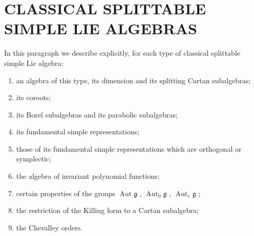 \section{CLASSICAL SPLITTABLE SIMPLE LIE ALGEBRAS}

In this paragraph we describe explicitly, for each type of classical splittable simple Lie algebra:

\begin{enumerate}
\def\labelenumi{(\Roman{enumi})}
\item
  an algebra of this type, its dimension and its splitting Cartan subalgebras;
\item
  its coroots;
\item
  its Borel subalgebras and its parabolic subalgebras;
\item
  its fundamental simple representations;
\item
  those of its fundamental simple representations which are orthogonal or symplectic;
\item
  the algebra of invariant polynomial functions;
\item
  certain properties of the groups \(\operatorname{Aut} \mathfrak{g}\) , \(\operatorname{Aut}_0 \mathfrak{g}\) , \(\operatorname{Aut}_e \mathfrak{g}\) ;
\item
  the restriction of the Killing form to a Cartan subalgebra;
\item
  the Chevalley orders.
\end{enumerate}

